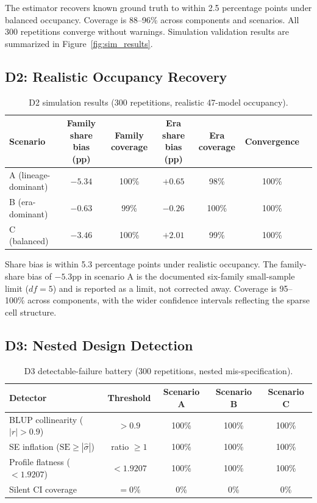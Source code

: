 \documentclass[journal]{IEEEtran}
\begin{document}
The estimator recovers known ground truth to within 2.5 percentage points under balanced occupancy. Coverage is 88--96\% across components and scenarios. All 300 repetitions converge without warnings. Simulation validation results are summarized in Figure~\ref{fig:sim_results}.

\subsection{D2: Realistic Occupancy Recovery}

\begin{table}[!t]
\centering
\caption{D2 simulation results (300 repetitions, realistic 47-model occupancy).}
\label{tab:d2}
\begin{tabular}{lcccccc}
\toprule
Scenario & Family share bias (pp) & Family coverage & Era share bias (pp) & Era coverage & Convergence \\
\midrule
A (lineage-dominant) & $-5.34$ & 100\% & $+0.65$ & 98\% & 100\% \\
B (era-dominant) & $-0.63$ & 99\% & $-0.26$ & 100\% & 100\% \\
C (balanced) & $-3.46$ & 100\% & $+2.01$ & 99\% & 100\% \\
\bottomrule
\end{tabular}
\end{table}

Share bias is within 5.3 percentage points under realistic occupancy. The family-share bias of $-5.3$pp in scenario A is the documented six-family small-sample limit ($df = 5$) and is reported as a limit, not corrected away. Coverage is 95--100\% across components, with the wider confidence intervals reflecting the sparse cell structure.

\subsection{D3: Nested Design Detection}

\begin{table}[!t]
\centering
\caption{D3 detectable-failure battery (300 repetitions, nested mis-specification).}
\label{tab:d3}
\begin{tabular}{lcccc}
\toprule
Detector & Threshold & Scenario A & Scenario B & Scenario C \\
\midrule
BLUP collinearity ($|r| > 0.9$) & $> 0.9$ & 100\% & 100\% & 100\% \\
SE inflation ($\text{SE} \geq |\hat{\sigma}|$) & ratio $\geq 1$ & 100\% & 100\% & 100\% \\
Profile flatness ($< 1.9207$) & $< 1.9207$ & 100\% & 100\% & 100\% \\
Silent CI coverage & $= 0\%$ & 0\% & 0\% & 0\% \\
\bottomrule
\end{tabular}
\end{table}
\end{document}
